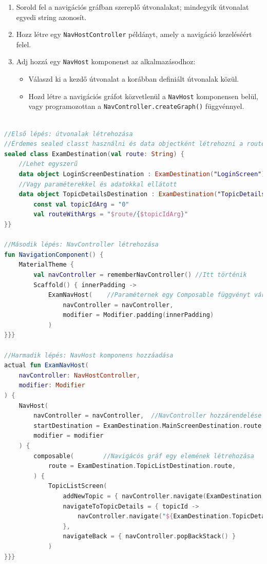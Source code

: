 \begin{enumerate}
    \item Sorold fel a navigációs gráfban szereplő útvonalakat; mindegyik útvonalat egyedi string azonosít.
    \item Hozz létre egy \texttt{NavHostController} példányt, amely a navigáció kezeléséért felel.
    \item Adj hozzá egy \texttt{NavHost} komponenst az alkalmazásodhoz:
        \begin{itemize}
            \item Válaszd ki a kezdő útvonalat a korábban definiált útvonalak közül.
            \item Hozd létre a navigációs gráfot közvetlenül a \texttt{NavHost} komponensen belül, vagy programozottan a \texttt{NavController.createGraph()} függvénnyel.
        \end{itemize}
\end{enumerate}

\begin{lstlisting}[caption={Példa a Navigation használatára.}, label={lst:nav}, language=Kotlin]

//Első lépés: útvonalak létrehozása
//Érdemes sealed classt használni és data objectként létrehozni a routeokat
sealed class ExamDestination(val route: String) {
    //Lehet egyszerű
    data object LoginScreenDestination : ExamDestination("LoginScreen")
    //Vagy paraméterekkel és adatokkal ellátott
    data object TopicDetailsDestination : ExamDestination("TopicDetails") {
        const val topicIdArg = "0"
        val routeWithArgs = "$route/{$topicIdArg}"
}}

//Második lépés: NavController létrehozása
fun NavigationComponent() {
    MaterialTheme {
        val navController = rememberNavController() //Itt történik
        Scaffold() { innerPadding ->
            ExamNavHost(    //Paraméternek egy Composable függvényt vár, ezen belül is egy NavHost függvényt
                navController = navController,
                modifier = Modifier.padding(innerPadding)
            )
}}}

//Harmadik lépés: NavHost komponens hozzáadása
actual fun ExamNavHost(
    navController: NavHostController,
    modifier: Modifier
) {
    NavHost(
        navController = navController,  //NavController hozzárendelése
        startDestination = ExamDestination.MainScreenDestination.route, //Kezdő útvonal beállítása
        modifier = modifier
    ) {
        composable(        //Navigácós gráf egy elemének létrehozása
            route = ExamDestination.TopicListDestination.route,
        ) {
            TopicListScreen(
                addNewTopic = { navController.navigate(ExamDestination.NewTopicDestination.route) },
                navigateToTopicDetails = { topicId ->
                    navController.navigate("${ExamDestination.TopicDetailsDestination.route}/${topicId}")
                },
                navigateBack = { navController.popBackStack() }
            )
}}}
\end{lstlisting}
